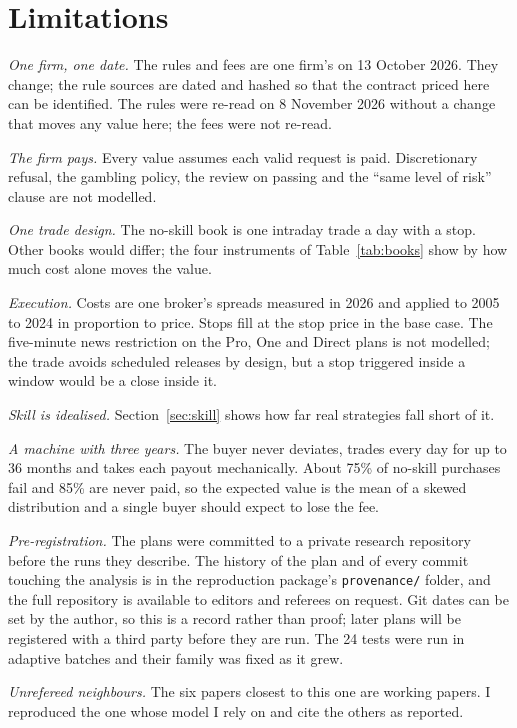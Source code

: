 \documentclass[11pt]{article}
\begin{document}
\section{Limitations}\label{sec:limits}
\emph{One firm, one date.} The rules and fees are one firm's on 13 October 2026. They change; the rule sources are
dated and hashed so that the contract priced here can be identified. The rules were re-read on 8 November 2026
without a change that moves any value here; the fees were not re-read.

\emph{The firm pays.} Every value assumes each valid request is paid. Discretionary refusal, the gambling
policy, the review on passing and the ``same level of risk'' clause are not modelled.

\emph{One trade design.} The no-skill book is one intraday trade a day with a stop. Other books would differ;
the four instruments of Table~\ref{tab:books} show by how much cost alone moves the value.

\emph{Execution.} Costs are one broker's spreads measured in 2026 and applied to 2005 to 2024 in proportion to
price. Stops fill at the stop price in the base case. The five-minute news restriction on the Pro, One and Direct
plans is not modelled; the trade avoids scheduled releases by design, but a stop triggered inside a window would
be a close inside it.

\emph{Skill is idealised.} Section~\ref{sec:skill} shows how far real strategies fall short of it.

\emph{A machine with three years.} The buyer never deviates, trades every day for up to 36 months and takes each
payout mechanically. About 75\% of no-skill purchases fail and 85\% are never paid, so the expected value is the
mean of a skewed distribution and a single buyer should expect to lose the fee.

\emph{Pre-registration.} The plans were committed to a private research repository before the runs they describe.
The history of the plan and of every commit touching the analysis is in the reproduction package's
\texttt{provenance/} folder, and the full repository is available to editors and referees on request. Git dates can
be set by the author, so this is a record rather than proof; later plans will be registered with a third party
before they are run. The 24 tests were run in adaptive batches and their family was fixed as it grew.

\emph{Unrefereed neighbours.} The six papers closest to this one are working papers. I reproduced the one whose
model I rely on and cite the others as reported.
\end{document}

